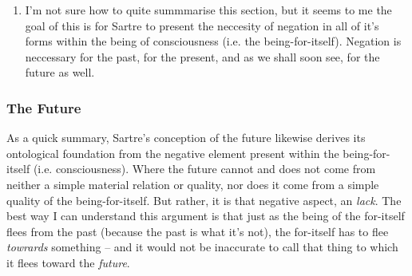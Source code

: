 \begin{enumerate}
  \item I'm not sure how to quite summmarise this section, but it seems to me the goal of this is for Sartre to present the neccesity of negation in all of it's forms within the being of consciousness (i.e. the being-for-itself). Negation is neccessary for the past, for the present, and as we shall soon see, for the future as well.
\end{enumerate}

\subsubsection*{The Future}
As a quick summary, Sartre's conception of the future likewise derives its ontological foundation from the negative element present within the being-for-itself (i.e. consciousness). Where the future cannot and does not come from neither a simple material relation or quality, nor does it come from a simple quality of the being-for-itself. But rather, it is that negative aspect, an \emph{lack}. The best way I can understand this argument is that just as the being of the for-itself flees from the past (because the past is what it's not), the for-itself has to flee \emph{towrards} something -- and it would not be inaccurate to call that thing to which it flees toward the \emph{future}.

